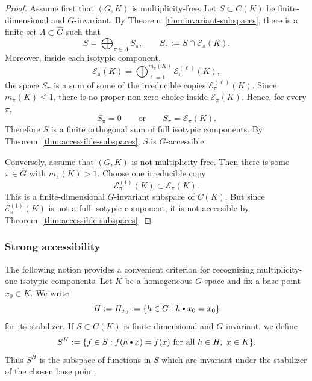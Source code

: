 \documentclass[11pt,showkeys]{amsart}
\newcommand{\hbullet}{\mathbin{\vcenter{\hbox{\scalebox{0.7}{$\bullet$}}}}}
\begin{document}
\begin{proof}
Assume first that \((G,K)\) is multiplicity-free. Let
\(S\subset C(K)\) be finite-dimensional and \(G\)-invariant. By
Theorem~\ref{thm:invariant-subspaces}, there is a finite set
\(\Lambda\subset\widehat G\) such that
\[
        S
        =
        \bigoplus_{\pi\in\Lambda}
        S_\pi,
        \qquad
        S_\pi:=S\cap\mathcal E_\pi(K).
\]
Moreover, inside each isotypic component,
\[
        \mathcal E_\pi(K)
        =
        \bigoplus_{\ell=1}^{m_\pi(K)}
        \mathcal E_\pi^{(\ell)}(K),
\]
the space \(S_\pi\) is a sum of some of the irreducible copies
\(\mathcal E_\pi^{(\ell)}(K)\). Since \(m_\pi(K)\leq 1\), there is no
proper non-zero choice inside \(\mathcal E_\pi(K)\). Hence, for every
\(\pi\),
\[
        S_\pi=0
        \qquad\text{or}\qquad
        S_\pi=\mathcal E_\pi(K).
\]
Therefore \(S\) is a finite orthogonal sum of full isotypic components.
By Theorem~\ref{thm:accessible-subspaces}, \(S\) is \(G\)-accessible.

Conversely, assume that \((G,K)\) is not multiplicity-free. Then there is some \(\pi\in\widehat G\) with
\(m_\pi(K)>1\). Choose one irreducible copy
\[
        \mathcal E_\pi^{(1)}(K)
        \subset
        \mathcal E_\pi(K).
\]
This is a finite-dimensional \(G\)-invariant subspace of \(C(K)\). But
since \(\mathcal E_\pi^{(1)}(K)\) is not a full isotypic component, it is not accessible by
Theorem~\ref{thm:accessible-subspaces}. 


\end{proof}


\subsubsection{Strong accessibility}
\label{sec:strong-accessibility}
The following notion provides a convenient criterion for recognizing multiplicity-one isotypic components.
Let \(K\) be a homogeneous \(G\)-space and fix a base point \(x_0\in K\).
We write
\[
        H:=H_{x_0}:=\{h\in G:h\hbullet x_0=x_0\}
\]
for its stabilizer. If \(S\subset C(K)\) is finite-dimensional and
\(G\)-invariant, we define
\[
        S^H
        :=
        \{f\in S:f(h\hbullet x)=f(x)
        \text{ for all }h\in H,\ x\in K\}.
\]
Thus \(S^H\) is the subspace of functions in \(S\) which are invariant
under the stabilizer of the chosen base point.
\end{document}
